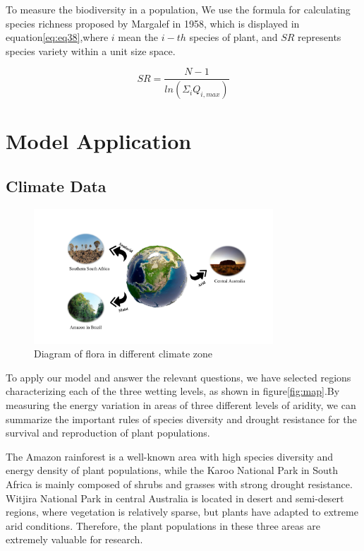 \documentclass[12pt]{article}  %
\newenvironment{shrinkeq}[1]
{ \bgroup
	\addtolength\abovedisplayshortskip{#1}
	\addtolength\abovedisplayskip{#1}
	\addtolength\belowdisplayshortskip{#1}
	\addtolength\belowdisplayskip{#1}}
{\egroup\ignorespacesafterend}
\begin{document}
 To measure the biodiversity in a population, We use the formula for calculating species richness proposed by Margalef in 1958, which is displayed in equation\eqref{eq:eq38},where $i$ mean the $i-th$ species of plant, and $SR$ represents species variety within a unit size space.

\begin{shrinkeq}{-1ex}
	\begin{equation}
    \label{eq:eq38}
    SR = \frac{N-1}{ln(\Sigma_i Q_{i,max})}
	\end{equation}
\end{shrinkeq}

\vspace{-0.5cm}
\section{Model Application}
\vspace{-0.3cm}
\subsection{Climate Data}

\begin{figure}[htbp]
	\centering
	\includegraphics[width=0.8\textwidth]{easymcm/img/map.pdf}
	\caption{Diagram of flora in different climate zone}
 \label{fig:map}
\end{figure}


To apply our model and answer the relevant questions, we have selected regions characterizing each of the three wetting levels, as shown in figure\eqref{fig:map}.By measuring the energy variation in areas of three different levels of aridity, we can summarize the important rules of species diversity and drought resistance for the survival and reproduction of plant populations. 

The Amazon rainforest is a well-known area with high species diversity and energy density of plant populations, while the Karoo National Park in South Africa is mainly composed of shrubs and grasses with strong drought resistance. Witjira National Park in central Australia is located in desert and semi-desert regions, where vegetation is relatively sparse, but plants have adapted to extreme arid conditions. Therefore, the plant populations in these three areas are extremely valuable for research.
\end{document}
